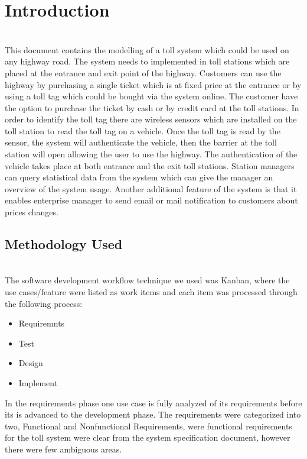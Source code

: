 \chapter{Introduction}
\trevon \\
\noindent
This document contains the modelling of a toll system which could be used on any highway road. The system needs to implemented in toll stations which are placed at the entrance and exit point of the highway. Customers can use the highway by purchasing a single ticket which is at fixed price at the entrance or by using a toll tag which could be bought via the system online. The customer have the option to purchase the ticket by cash or by credit card at the toll stations. In order to identify the toll tag there are wireless sensors which are installed on the toll station to read the toll tag on a vehicle. Once the toll tag is read by the sensor, the system will authenticate the vehicle, then the barrier at the toll station will open allowing the user to use the highway. The authentication of the vehicle takes place at both entrance and the exit toll stations. Station managers can query statistical data from the system which can give the manager an overview of the system usage. Another additional feature of the system is that it enables enterprise manager to send email or mail notification to customers about prices changes.
\section{Methodology Used}
\trevon \\
The software development workflow technique we used was Kanban, where the use cases/feature were listed as work items and each item was processed through the following process:

\begin{itemize}
  \item Requiremnts 
  \item Test
  \item Design
  \item Implement
\end{itemize}


In the requirements phase one use case is fully analyzed of its requirements before its is advanced to the development phase. The requirements were categorized into two, Functional and Nonfunctional Requirements, were functional requirements for the toll system were clear from the system specification document, however there were few ambiguous areas. 

